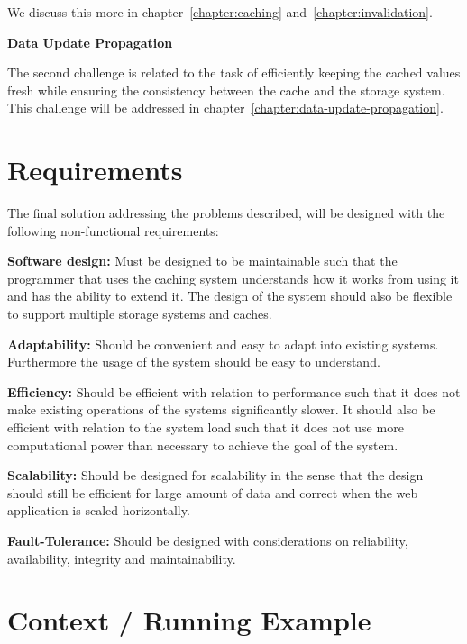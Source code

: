 We discuss this more in chapter~\ref{chapter:caching} and~\ref{chapter:invalidation}.

\textbf{Data Update Propagation}

The second challenge is related to the task of efficiently keeping the cached values fresh while ensuring the consistency between the cache and the storage system. This challenge will be addressed in chapter~\ref{chapter:data-update-propagation}.



\section{Requirements}
\label{sec:requirements}

The final solution addressing the problems described, will be designed with the following non-functional requirements:

\textbf{Software design:} Must be designed to be maintainable such that the programmer that uses the caching system understands how it works from using it and has the ability to extend it. The design of the system should also be flexible to support multiple storage systems and caches.

\textbf{Adaptability:} Should be convenient and easy to adapt into existing systems. Furthermore the usage of the system should be easy to understand.

\textbf{Efficiency:} Should be efficient with relation to performance such that it does not make existing operations of the systems significantly slower. It should also be efficient with relation to the system load such that it does not use more computational power than necessary to achieve the goal of the system.

\textbf{Scalability:} Should be designed for scalability in the sense that the design should still be efficient for large amount of data and correct when the web application is scaled horizontally.

\textbf{Fault-Tolerance:} Should be designed with considerations on reliability, availability, integrity and maintainability.


\section{Context / Running Example}
\label{sec:context}

